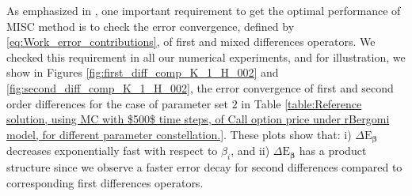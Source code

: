 \begin{remark}
As emphasized in \cite{haji2016multi}, one important requirement to get the optimal performance of MISC method is to check  the error convergence, defined by \eqref{eq:Work_error_contributions},  of first and mixed differences operators. We checked this requirement in all our numerical experiments, and for illustration, we show in Figures  \ref{fig:first_diff_comp_K_1_H_002} and \ref{fig:second_diff_comp_K_1_H_002}, the error convergence of first and second order differences for the case of parameter set $2$ in Table \ref{table:Reference solution, using MC with $500$ time steps, of Call option price under rBergomi model, for different parameter constellation.}.  These plots show that: i) $\Delta \text{E}_{\boldsymbol{\beta}}$ decreases exponentially fast with respect to $\beta_i$, and ii) $\Delta \text{E}_{\boldsymbol{\beta}}$ has a  product structure since  we  observe  a faster error decay for second differences compared to corresponding first differences operators.
\end{remark} 

